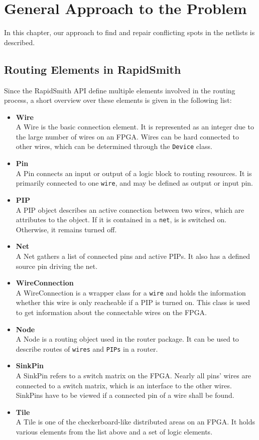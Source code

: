 \chapter{General Approach to the Problem}
\label{cha:approachestotheproblem}

In this chapter, our approach to find and repair conflicting spots in the netlists is described.

\section{Routing Elements in RapidSmith}
\label{sec:routingelementsinrapidsmith}

Since the RapidSmith API define multiple elements involved in the routing process, a short overview over these elements is given in the following list:
\begin{itemize}
\item \textbf{Wire}\hfill \\
A Wire is the basic connection element. It is represented as an integer due to the large number of wires on an FPGA. Wires can be hard connected to other wires, which can be determined through the \texttt{Device} class.
\item \textbf{Pin}\hfill \\
A Pin connects an input or output of a logic block to routing resources. It is primarily connected to one \texttt{wire}, and may be defined as output or input pin.
\item \textbf{PIP}\hfill \\
A PIP object describes an active connection between two wires, which are attributes to the object. If it is contained in a \texttt{net}, is is switched on. Otherwise, it remains turned off.
\item \textbf{Net}\hfill \\
A Net gathers a list of connected pins and active PIPs. It also has a defined source pin driving the net.
\item \textbf{WireConnection}\hfill \\
A WireConnection is a wrapper class for a \texttt{wire} and holds the information whether this wire is only reacheable if a PIP is turned on. This class is used to get information about the connectable wires on the FPGA.
\item \textbf{Node}\hfill \\
A Node is a routing object used in the router package. It can be used to describe routes of \texttt{wires} and \texttt{PIPs} in a router.
\item \textbf{SinkPin}\hfill \\
A SinkPin refers to a switch matrix on the FPGA. Nearly all pins' wires are connected to a switch matrix, which is an interface to the other wires. SinkPins have to be viewed if a connected pin of a wire shall be found.
\item \textbf{Tile}\hfill \\
A Tile is one of the checkerboard-like distributed areas on an FPGA. It holds various elements from the list above and a set of logic elements. 

\end{itemize}

